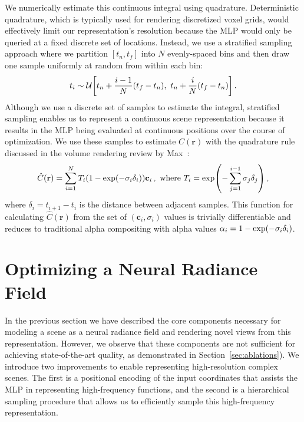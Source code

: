 \documentclass[runningheads]{llncs}
\let\originalleft\left
\let\originalright\right
\renewcommand{\left}{\mathopen{}\mathclose\bgroup\originalleft}
\renewcommand{\right}{\aftergroup\egroup\originalright}
\newcommand{\expo}[1]{\exp\left(#1\right)}
\newcommand{\absrp}{\sigma}
\newcommand{\numsamples}{N}
\newcommand{\timenear}{t_n}
\newcommand{\timefar}{t_f}
\newcommand{\deltatime}{\delta}
\newcommand{\ray}{\mathbf{r}}
\newcommand{\Ctrue}{C(\ray)}
\begin{document}
We numerically estimate this continuous integral using quadrature. Deterministic quadrature, which is typically used for rendering discretized voxel grids, would effectively limit our representation's resolution because the MLP would only be queried at a fixed discrete set of locations. Instead, we use a stratified sampling approach where we partition $[\timenear, \timefar]$ into $\numsamples$ evenly-spaced bins and then draw one sample uniformly at random from within each bin:
\begin{equation}
    t_i \sim \mathcal{U} \left[ \timenear + \frac{i-1}{\numsamples}(\timefar-\timenear),\,\, \timenear + \frac{i}{\numsamples}(\timefar-\timenear) \right]\,.
    \label{eq:stratified}
\end{equation} 
Although we use a discrete set of samples to estimate the integral, stratified sampling enables us to represent a continuous scene representation because it results in the MLP being evaluated at continuous positions over the course of optimization. We use these samples to estimate $\Ctrue$ with the quadrature rule discussed in the volume rendering review by Max~\cite{max95}:
\begin{equation}
\label{eqn:render_coarse}
\hat{C}(\mathbf{r})=\sum_{i=1}^{\numsamples}T_i (1-\expo{-\absrp_i \deltatime_i}) \mathbf{c}_i\,, \textrm{ where }
T_i=\expo{- \sum_{j=1}^{i-1} \absrp_j \deltatime_j}\,,
\end{equation}
where $\deltatime_i = t_{i+1} - t_i $ is the distance between adjacent samples. 
This function for calculating $\hat{C}(\mathbf{r})$ from the set of $(\mathbf{c}_i, \absrp_i)$ values is trivially differentiable and reduces to traditional alpha compositing with alpha values $\alpha_i = 1-\expo{-\absrp_i \deltatime_i}$. 



\section{Optimizing a Neural Radiance Field}

In the previous section we have described the core components necessary for modeling a scene as a neural radiance field and rendering novel views from this representation. However, we observe that these components are not sufficient for achieving state-of-the-art quality, as demonstrated in Section~\ref{sec:ablations}). We introduce two improvements to enable representing high-resolution complex scenes. The first is a positional encoding of the input coordinates that assists the MLP in representing high-frequency functions, and the second is a hierarchical sampling procedure that allows us to efficiently sample this high-frequency representation. 
\end{document}

